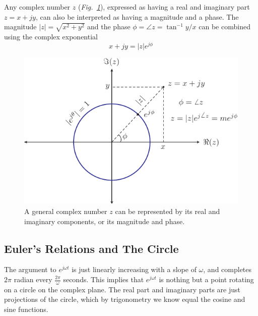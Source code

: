 Any complex number $z$ (\emph{Fig.~\ref{fig:complex}}), expressed as having a real and imaginary part $ z = x + j y$, can also be interpreted as having a magnitude and a phase.  The magnitude  $|z| = \sqrt{x^2 + y^2}$ and the phase $\phi = \angle z = \tan^{-1} y/x$ can be combined using the complex exponential
    \begin{equation}
        x + j y = |z| e^{j\phi}
    \end{equation}
\begin{figure}[H]
\centering
\includegraphics[width=.55\columnwidth]{complex}
\caption{A general complex number $z$ can be represented by its real and imaginary components, or its magnitude and phase.}
\label{fig:complex}
\end{figure}
\subsection{Euler's Relations and The Circle}
The argument to $e^{j \omega t}$ is just linearly increasing with a slope of $\omega$, and completes $2\pi$ radian every $\frac{2\pi}{\omega}$ seconds.  This implies that $e^{j \omega t}$ is nothing but a point rotating on a circle on the complex plane.  The real part and imaginary parts are just projections of the circle, which by trigonometry we know equal the cosine and sine functions.

